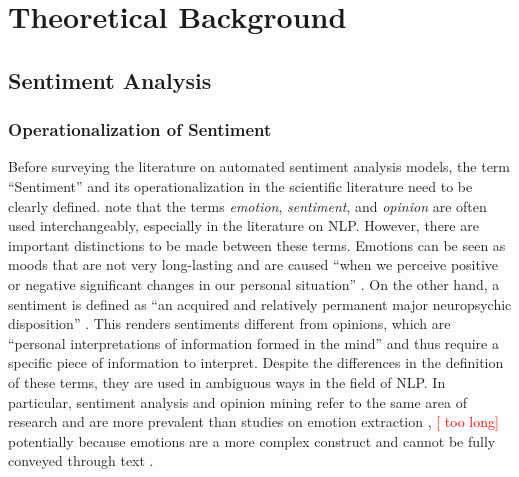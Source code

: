 \section{Theoretical Background}



\subsection{Sentiment Analysis}  %
\subsubsection{Operationalization of Sentiment}
Before surveying the literature on automated sentiment analysis models, the term ``Sentiment'' and its operationalization in the scientific literature need to be clearly defined.  note that the terms \emph{emotion}, \emph{sentiment}, and \emph{opinion} are often used interchangeably, especially in the literature on NLP. However, there are important distinctions to be made between these terms. Emotions can be seen as moods that are not very long-lasting and are caused ``when we perceive positive or negative significant changes in our personal situation'' . On the other hand, a sentiment is defined as ``an acquired and relatively permanent major neuropsychic disposition'' \cite[p.~16]{cattell1940sentiment}. This renders sentiments different from opinions, which are ``personal interpretations of information formed in the mind'' \cite[p.~4]{munezero2014they} and thus require a specific piece of information to interpret. %
Despite the differences in the definition of these terms, they are used in ambiguous ways in the field of NLP. In particular, sentiment analysis and opinion mining refer to the same area of research \cite{liu2012book} and are more prevalent than studies on emotion extraction , \textcolor{red}{[ too long]} potentially because emotions are a more complex construct and cannot be fully conveyed through text .

